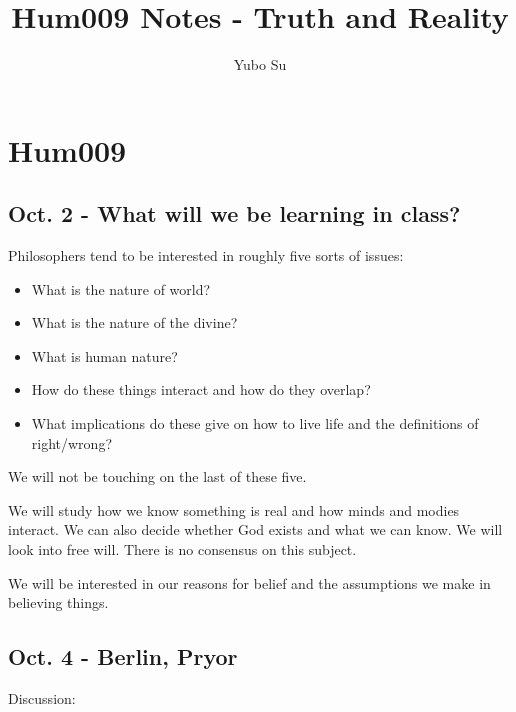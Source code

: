 \documentclass{report}
\begin{document}
\title{Hum009 Notes - Truth and Reality}
\author{Yubo Su}
\date{ }

\maketitle

\tableofcontents

\chapter{Hum009}

\section{Oct. 2 - What will we be learning in class?}

Philosophers tend to be interested in roughly five sorts of issues:

\begin{itemize}
\item What is the nature of world?
\item What is the nature of the divine?
\item What is human nature?
\item How do these things interact and how do they overlap?
\item What implications do these give on how to live life and the definitions of right/wrong?
\end{itemize}

We will not be touching on the last of these five.

We will study how we know something is real and how minds and modies interact. We can also decide whether God exists and what we can know. We will look into free will. There is no consensus on this subject.

We will be interested in our reasons for belief and the assumptions we make in believing things.

\section{Oct. 4 - Berlin, Pryor}

Discussion:
\end{document}
